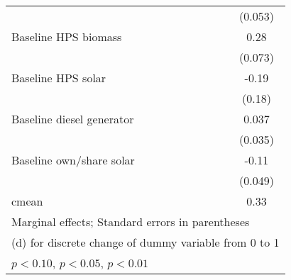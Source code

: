 \begin{table}[htbp]
\begin{tabular*}{1\hsize}{@{\hskip\tabcolsep\extracolsep\fill}l*{5}{c}}
                &                  &                  &                  &                  &  (0.053)         \\
Baseline HPS biomass&                  &                  &                  &                  &     0.28\sym{***}\\
                &                  &                  &                  &                  &  (0.073)         \\
Baseline HPS solar&                  &                  &                  &                  &    -0.19         \\
                &                  &                  &                  &                  &   (0.18)         \\
Baseline diesel generator&                  &                  &                  &                  &    0.037         \\
                &                  &                  &                  &                  &  (0.035)         \\
Baseline own/share solar&                  &                  &                  &                  &    -0.11\sym{**} \\
                &                  &                  &                  &                  &  (0.049)         \\
\midrule
cmean           &                  &                  &                  &                  &     0.33         \\
\bottomrule
\multicolumn{6}{l}{\footnotesize Marginal effects; Standard errors in parentheses}\\
\multicolumn{6}{l}{\footnotesize  (d) for discrete change of dummy variable from 0 to 1}\\
\multicolumn{6}{l}{\footnotesize \sym{*} \(p<0.10\), \sym{**} \(p<0.05\), \sym{***} \(p<0.01\)}\\
\end{tabular*}
\end{table}
